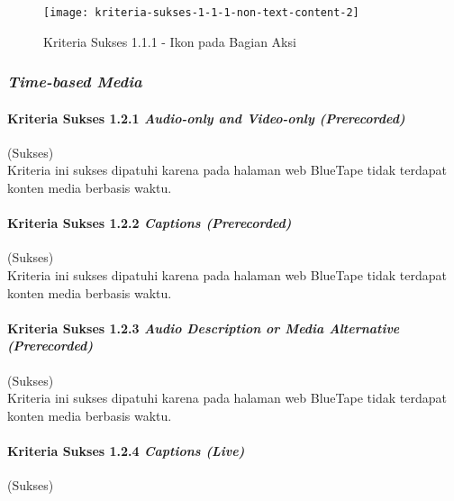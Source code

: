 \begin{itemize}
    \begin{figure}[H]
        \centering  
        \texttt{[image: kriteria-sukses-1-1-1-non-text-content-2]}  
        \caption[Kriteria Sukses 1.1.1 - Ikon pada Bagian Aksi]{Kriteria Sukses 1.1.1 - Ikon pada Bagian Aksi}
        \label{fig:1.1.1_non_text_content_2}  
    \end{figure} 
\end{itemize}

\subsubsection{\textit{Time-based Media}}
\label{subsubsec:kepatuhan_bluetape_time_based_media}

\paragraph{Kriteria Sukses 1.2.1 \textit{Audio-only and Video-only (Prerecorded)}}
\label{par:kepatuhan_bluetape_kriteria_sukses_1.2.1}
(Sukses)\\

Kriteria ini sukses dipatuhi karena pada halaman web BlueTape tidak terdapat konten media berbasis waktu.

\paragraph{Kriteria Sukses 1.2.2 \textit{Captions (Prerecorded)}}
\label{par:kepatuhan_bluetape_kriteria_sukses_1.2.2}
(Sukses)\\

Kriteria ini sukses dipatuhi karena pada halaman web BlueTape tidak terdapat konten media berbasis waktu.

\paragraph{Kriteria Sukses 1.2.3 \textit{Audio Description or Media Alternative (Prerecorded)}}
\label{par:kepatuhan_bluetape_kriteria_sukses_1.2.3}
(Sukses)\\

Kriteria ini sukses dipatuhi karena pada halaman web BlueTape tidak terdapat konten media berbasis waktu.

\paragraph{Kriteria Sukses 1.2.4 \textit{Captions (Live)}}
\label{par:kepatuhan_bluetape_kriteria_sukses_1.2.4}
(Sukses)\\

